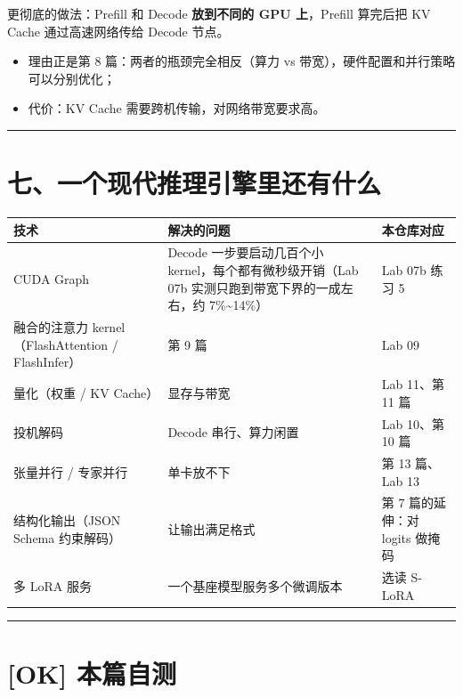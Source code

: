 更彻底的做法：Prefill 和 Decode \textbf{放到不同的 GPU 上}，Prefill 算完后把 KV Cache 通过高速网络传给 Decode 节点。
\begin{itemize}
  \item 理由正是第 8 篇：两者的瓶颈完全相反（算力 vs 带宽），硬件配置和并行策略可以分别优化；
  \item 代价：KV Cache 需要跨机传输，对网络带宽要求高。
\end{itemize}

\vspace{0.8em}\hrule\vspace{0.8em}

\section{七、一个现代推理引擎里还有什么}

\begin{center}
\small
\begin{tabularx}{\textwidth}{p{3cm} p{4.5cm} X}
\toprule
\textbf{技术} & \textbf{解决的问题} & \textbf{本仓库对应} \\
\midrule
CUDA Graph & Decode 一步要启动几百个小 kernel，每个都有微秒级开销（Lab 07b 实测只跑到带宽下界的一成左右，约 7\%\textasciitilde{}14\%） & Lab 07b 练习 5 \\
融合的注意力 kernel（FlashAttention / FlashInfer） & 第 9 篇 & Lab 09 \\
量化（权重 / KV Cache） & 显存与带宽 & Lab 11、第 11 篇 \\
投机解码 & Decode 串行、算力闲置 & Lab 10、第 10 篇 \\
张量并行 / 专家并行 & 单卡放不下 & 第 13 篇、Lab 13 \\
结构化输出（JSON Schema 约束解码） & 让输出满足格式 & 第 7 篇的延伸：对 logits 做掩码 \\
多 LoRA 服务 & 一个基座模型服务多个微调版本 & 选读 S-LoRA \\
\bottomrule
\end{tabularx}
\end{center}

\vspace{0.8em}\hrule\vspace{0.8em}

\section{[OK] 本篇自测}

